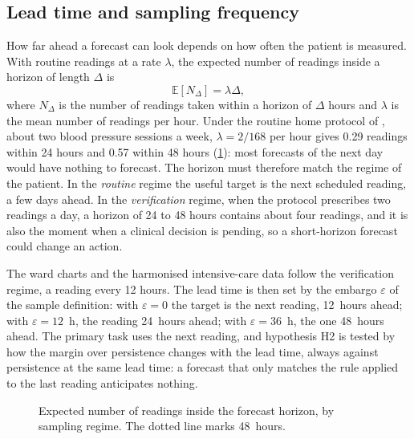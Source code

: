 \documentclass[11pt,a4paper,oneside]{report}
\begin{document}
\subsection{Lead time and sampling frequency}\label{sec:horizon}\label{sec:forecasting}

How far ahead a forecast can look depends on how often the patient is measured. With routine readings at a rate $\lambda$, the expected number of readings inside a horizon of length $\Delta$ is
\begin{equation}
  \mathbb{E}[N_\Delta] = \lambda\Delta ,
\end{equation}
where $N_\Delta$ is the number of readings taken within a horizon of $\Delta$ hours and $\lambda$ is the mean number of readings per hour.
Under the routine home protocol of \textcite{mihevc2025}, about two blood pressure sessions a week, $\lambda = 2/168$ per hour gives 0.29 readings within 24 hours and 0.57 within 48 hours (\cref{fig:sampling-horizon}): most forecasts of the next day would have nothing to forecast. The horizon must therefore match the regime of the patient. In the \emph{routine} regime the useful target is the next scheduled reading, a few days ahead. In the \emph{verification} regime, when the protocol prescribes two readings a day, a horizon of 24 to 48 hours contains about four readings, and it is also the moment when a clinical decision is pending, so a short-horizon forecast could change an action.

The ward charts and the harmonised intensive-care data follow the verification regime, a reading every 12 hours. The lead time is then set by the embargo $\varepsilon$ of the sample definition: with $\varepsilon = 0$ the target is the next reading, 12~hours ahead; with $\varepsilon = 12$~h, the reading 24~hours ahead; with $\varepsilon = 36$~h, the one 48~hours ahead. The primary task uses the next reading, and hypothesis H2 is tested by how the margin over persistence changes with the lead time, always against persistence at the same lead time: a forecast that only matches the rule applied to the last reading anticipates nothing.

\begin{figure}[htbp]
\centering
{}
\caption{Expected number of readings inside the forecast horizon, by sampling regime. The dotted line marks 48~hours.}\label{fig:sampling-horizon}
\end{figure}
\end{document}

